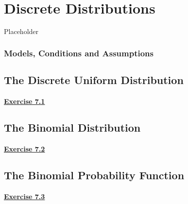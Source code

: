 \documentclass[
  11pt,
]{book}
\begin{document}
\chapter{Discrete Distributions}\label{discrete-distributions}

Placeholder

\subsection*{Models, Conditions and Assumptions}\label{models-conditions-and-assumptions}

\section{The Discrete Uniform Distribution}\label{the-discrete-uniform-distribution}

\subsubsection*{\texorpdfstring{\hyperref[ex71a]{Exercise 7.1}}{Exercise 7.1}}\label{exercise-7.1}

\section{The Binomial Distribution}\label{the-binomial-distribution}

\subsubsection*{\texorpdfstring{\hyperref[ex72a]{Exercise 7.2}}{Exercise 7.2}}\label{exercise-7.2}

\section{The Binomial Probability Function}\label{the-binomial-probability-function}

\subsubsection*{\texorpdfstring{\hyperref[ex73a]{Exercise 7.3}}{Exercise 7.3}}\label{exercise-7.3}
\end{document}
